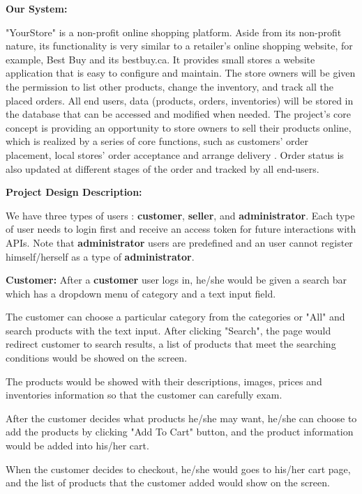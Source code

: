 \documentclass[12pt]{article}
\begin{document}
\vspace*{10mm}

\textbf{Our System:}
\vspace*{5mm}

"YourStore" is a non-profit online shopping platform. Aside from its non-profit nature, its functionality is very similar to a retailer’s online shopping website, for example, Best Buy and its bestbuy.ca. It provides small stores a website
application that is easy to configure and maintain. The store owners will be given the permission to list other products, change the inventory, and track all the placed orders. All end users, data (products, orders, inventories) will be stored
in the database that can be accessed and modified when needed. The project’s core concept is providing an opportunity to store owners to sell their products online, which is realized by a series of core functions, such as customers' order placement, local stores'
order acceptance and arrange delivery . Order status is also updated at different stages of the order and tracked by all end-users.

\newpage
\textbf{Project Design Description:}

We have three types of users : \textbf{customer}, \textbf{seller}, and \textbf{administrator}. Each type of user needs to
login first and receive an access token for future interactions with APIs. Note that \textbf{administrator} users
are predefined and an user cannot register himself/herself as a type of \textbf{administrator}.
\vspace*{5mm}

\textbf{Customer:}
After a \textbf{customer} user logs in, he/she would be given a search bar which has a dropdown menu of category and a text input
field.

The customer can choose a particular category from the categories or "All" and search products with the text input. After clicking "Search",
the page would redirect customer to search results, a list of products that meet the searching conditions would be showed on the screen.

The products would be showed with their descriptions, images, prices and inventories information so that the customer can carefully exam.

After the customer decides what products he/she may want, he/she can choose to add the products by clicking "Add To Cart" button, and the product information
would be added into his/her cart.

When the customer decides to checkout, he/she would goes to his/her cart page, and the list of products that the
customer added would show on the screen.
\end{document}
